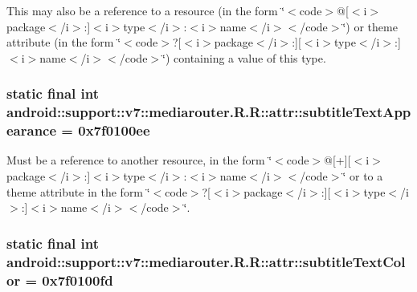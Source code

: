This may also be a reference to a resource (in the form \char`\"{}$<$code$>$@\mbox{[}$<$i$>$package$<$/i$>$:\mbox{]}$<$i$>$type$<$/i$>$:$<$i$>$name$<$/i$>$$<$/code$>$\char`\"{}) or theme attribute (in the form \char`\"{}$<$code$>$?\mbox{[}$<$i$>$package$<$/i$>$:\mbox{]}\mbox{[}$<$i$>$type$<$/i$>$:\mbox{]}$<$i$>$name$<$/i$>$$<$/code$>$\char`\"{}) containing a value of this type. \hypertarget{classandroid_1_1support_1_1v7_1_1mediarouter_1_1_r_1_1attr_abccd89961bcd4b0af747a52cd36e8ad}{
\subsubsection[{subtitleTextAppearance}]{\setlength{\rightskip}{0pt plus 5cm}static final int android::support::v7::mediarouter.R.R::attr::subtitleTextAppearance = 0x7f0100ee}}
\label{classandroid_1_1support_1_1v7_1_1mediarouter_1_1_r_1_1attr_abccd89961bcd4b0af747a52cd36e8ad}


Must be a reference to another resource, in the form \char`\"{}$<$code$>$@\mbox{[}+\mbox{]}\mbox{[}$<$i$>$package$<$/i$>$:\mbox{]}$<$i$>$type$<$/i$>$:$<$i$>$name$<$/i$>$$<$/code$>$\char`\"{} or to a theme attribute in the form \char`\"{}$<$code$>$?\mbox{[}$<$i$>$package$<$/i$>$:\mbox{]}\mbox{[}$<$i$>$type$<$/i$>$:\mbox{]}$<$i$>$name$<$/i$>$$<$/code$>$\char`\"{}. \hypertarget{classandroid_1_1support_1_1v7_1_1mediarouter_1_1_r_1_1attr_471a4be50e05a2ee4aaa1b5684d4c564}{
\subsubsection[{subtitleTextColor}]{\setlength{\rightskip}{0pt plus 5cm}static final int android::support::v7::mediarouter.R.R::attr::subtitleTextColor = 0x7f0100fd}}
\label{classandroid_1_1support_1_1v7_1_1mediarouter_1_1_r_1_1attr_471a4be50e05a2ee4aaa1b5684d4c564}


